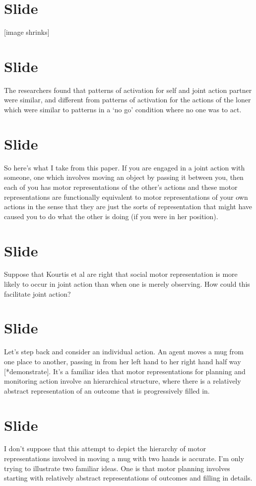 \documentclass[12pt,\papersize]{extarticle}
\begin{document}
\section{Slide}
[image shrinks]


\section{Slide}
The researchers found that patterns of activation for self and joint action partner were similar, and different from patterns of activation for the actions of the loner which were similar to patterns in a ‘no go’ condition where no one was to act.



\section{Slide}
So here’s what I take from this paper.
If you are engaged in a joint action with someone, one which involves moving an object by passing it between you, then each of you has motor representations of the other’s actions and these motor representations are functionally equivalent to motor representations of your own actions in the sense that they are just the sorts of representation that might have caused you to do what the other is doing (if you were in her position).


\section{Slide}
Suppose that Kourtis et al are right that social motor representation is more likely to occur in joint action than when one is merely observing.
How could this facilitate joint action?



\section{Slide}
Let’s step back and consider an individual action.
An agent moves a mug from one place to another, passing in from her left hand to her right hand half way [*demonstrate].
It’s a familiar idea that motor representations for planning and monitoring action involve an hierarchical structure,
where there is a relatively abstract representation of an outcome that is progressively filled in.




\section{Slide}
I don’t suppose that this attempt to depict the hierarchy of motor representations involved in moving a mug with two hands is accurate.
I’m only trying to illustrate two familiar ideas.
One is that motor planning involves starting with relatively abstract representations of outcomes and filling in details.
\end{document}
